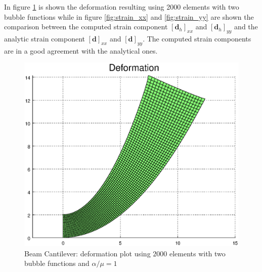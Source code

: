 \documentclass[preprint,12pt,authoryear]{elsarticle}
\begin{document}
In figure \ref{fig:deformation_beam} is shown the deformation resulting using 2000 elements with two bubble functions while in figure \ref{fig:strain_xx} and \ref{fig:strain_yy} are shown the comparison between the computed strain component $\left[\bm{d}_{h}\right]_{xx}$ and $\left[\bm{d}_{h}\right]_{yy}$ and the analytic strain component $\left[\bm{d}\right]_{xx}$ and $\left[\bm{d}\right]_{yy}$.
The computed strain components are in a good agreement with the analytical ones.
\begin{figure}[h!]
\begin{center}
\includegraphics[scale=0.30]{figure/defo_beam.eps}
\caption{Beam Cantilever: deformation plot using $2000$ elements with 
two bubble functions and $\alpha/ \mu=1$ \label{fig:deformation_beam}}
\end{center}
\end{figure}
%
\end{document}
